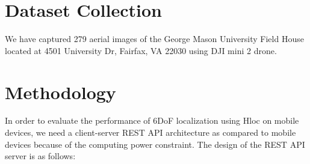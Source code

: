 \documentclass[sigconf]{acmart}
\begin{document}
\section{Dataset Collection}
We have captured 279 aerial images of the George Mason University Field House located at 4501 University Dr, Fairfax, VA 22030 using DJI mini 2 drone.


\section{Methodology}
In order to evaluate the performance of 6DoF localization using Hloc\cite{hloc} on mobile devices, we need a client-server REST API architecture as compared to mobile devices because of the computing power constraint. 
\newline 
\newline 
The design of the REST API server is as follows:
\end{document}
